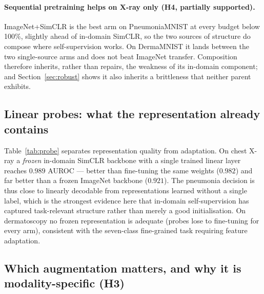 \documentclass{article}
\begin{document}
\begin{table}[t]
\centering
\caption{Paired difference in test AUROC against the from-scratch arm (same seeds, same
label subsets). $^{*}$: $p<0.05$, paired $t$-test, $n=3$ seeds.}
\label{tab:deltas}
\small

\end{table}

\paragraph{Sequential pretraining helps on X-ray only (H4, partially supported).}
ImageNet+SimCLR is the best arm on PneumoniaMNIST at every budget below 100\%, slightly
ahead of in-domain SimCLR, so the two sources of structure do compose where
self-supervision works. On DermaMNIST it lands between the two single-source arms and
does not beat ImageNet transfer. Composition therefore inherits, rather than repairs, the
weakness of its in-domain component; and Section~\ref{sec:robust} shows it also inherits a
brittleness that neither parent exhibits.

\subsection{Linear probes: what the representation already contains}

Table~\ref{tab:probe} separates representation quality from adaptation. On chest X-ray a
\emph{frozen} in-domain SimCLR backbone with a single trained linear layer reaches
$0.989$ AUROC --- better than fine-tuning the same weights ($0.982$) and far better than a
frozen ImageNet backbone ($0.921$). The pneumonia decision is thus close to linearly
decodable from representations learned without a single label, which is the strongest
evidence here that in-domain self-supervision has captured task-relevant structure rather
than merely a good initialisation. On dermatoscopy no frozen representation is adequate
(probes lose to fine-tuning for every arm), consistent with the seven-class fine-grained
task requiring feature adaptation.

\begin{table}[t]
\centering
\caption{Frozen linear probe versus full fine-tuning at the 10\% label budget (test
AUROC). A positive final column means the frozen representation is already better than
what fine-tuning reaches.}
\label{tab:probe}
\small

\end{table}

\subsection{Which augmentation matters, and why it is modality-specific (H3)}
\end{document}
